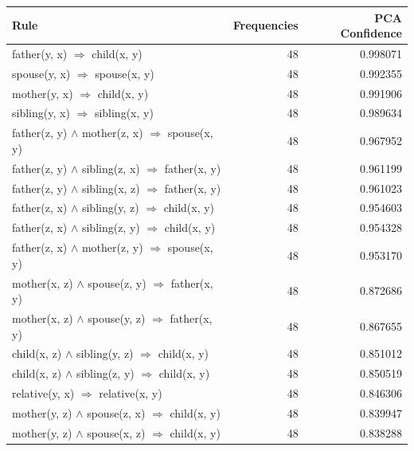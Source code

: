 \newpage
\begin{longtable}{lrr}
\toprule
                                                    Rule &  Frequencies &  PCA Confidence \\
\midrule
                       father(y, x)   $\Rightarrow$ child(x, y) &           48 &        0.998071 \\
                      spouse(y, x)   $\Rightarrow$ spouse(x, y) &           48 &        0.992355 \\
                       mother(y, x)   $\Rightarrow$ child(x, y) &           48 &        0.991906 \\
                    sibling(y, x)   $\Rightarrow$ sibling(x, y) &           48 &        0.989634 \\
      father(z, y) $\wedge$ mother(z, x)   $\Rightarrow$ spouse(x, y) &           48 &        0.967952 \\
     father(z, y) $\wedge$ sibling(z, x)   $\Rightarrow$ father(x, y) &           48 &        0.961199 \\
     father(z, y) $\wedge$ sibling(x, z)   $\Rightarrow$ father(x, y) &           48 &        0.961023 \\
      father(z, x) $\wedge$ sibling(y, z)   $\Rightarrow$ child(x, y) &           48 &        0.954603 \\
      father(z, x) $\wedge$ sibling(z, y)   $\Rightarrow$ child(x, y) &           48 &        0.954328 \\
      father(z, x) $\wedge$ mother(z, y)   $\Rightarrow$ spouse(x, y) &           48 &        0.953170 \\
      mother(x, z) $\wedge$ spouse(z, y)   $\Rightarrow$ father(x, y) &           48 &        0.872686 \\
      mother(x, z) $\wedge$ spouse(y, z)   $\Rightarrow$ father(x, y) &           48 &        0.867655 \\
       child(x, z) $\wedge$ sibling(y, z)   $\Rightarrow$ child(x, y) &           48 &        0.851012 \\
       child(x, z) $\wedge$ sibling(z, y)   $\Rightarrow$ child(x, y) &           48 &        0.850519 \\
                  relative(y, x)   $\Rightarrow$ relative(x, y) &           48 &        0.846306 \\
       mother(y, z) $\wedge$ spouse(z, x)   $\Rightarrow$ child(x, y) &           48 &        0.839947 \\
       mother(y, z) $\wedge$ spouse(x, z)   $\Rightarrow$ child(x, y) &           48 &        0.838288 \\

\end{longtable}
